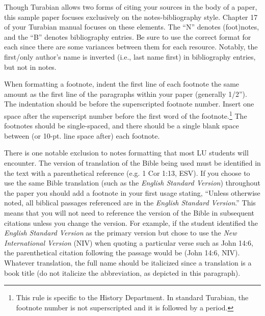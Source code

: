 \documentclass[raggedright]{turabian-researchpaper}
\begin{document}
Though Turabian allows two forms of citing your sources in the body of a paper,
this sample paper focuses exclusively on the notes-bibliography style. Chapter
17 of your Turabian manual focuses on these elements. The ``N'' denotes
(foot)notes, and the ``B'' denotes bibliography entries. Be sure to use the
correct format for each since there are some variances between them for each
resource. Notably, the first/only author's name is inverted (i.e., last name
first) in bibliography entries, but not in notes.

When formatting a footnote, indent the first line of each footnote the same
amount as the first line of the paragraphs within your paper (generally 1/2'').
The indentation should be before the superscripted footnote number. Insert one
space after the superscript number before the first word of the
footnote.\footnote{This rule is specific to the History Department. In standard
Turabian, the footnote number is not superscripted and it is followed by a
period.} The footnotes should be single-spaced, and there should be a single
blank space between (or 10-pt. line space after) each footnote.

There is one notable exclusion to notes formatting that most LU students will
encounter. The version of translation of the Bible being used must be identified
in the text with a parenthetical reference (e.g. 1 Cor 1:13, ESV). If you choose
to use the same Bible translation (such as the \textit{English Standard
Version}) throughout the paper you should add a footnote in your first usage
stating, ``Unless otherwise noted, all biblical passages referenced are in the
\textit{English Standard Version}.'' This means that you will not need to
reference the version of the Bible in subsequent citations unless you change the
version. For example, if the student identified the \textit{English Standard
Version} as the primary version but chose to use the \textit{New International
Version} (NIV) when quoting a particular verse such as John 14:6, the
parenthetical citation following the passage would be (John 14:6, NIV). Whatever
translation, the full name should be italicized since a translation is a book
title (do not italicize the abbreviation, as depicted in this paragraph).
\end{document}
